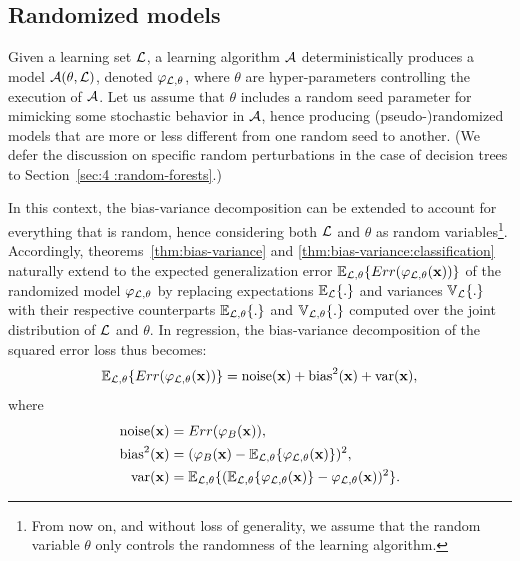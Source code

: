 \subsection{Randomized models}

Given a learning set ${\cal L}$, a learning algorithm ${\cal A}$
deterministically produces a model ${\cal A}(\theta, {\cal L})$, denoted
$\varphi_{{\cal L},\theta}$\label{ntn:varphi-Ltheta}, where $\theta$ are
hyper-parameters controlling the execution of ${\cal A}$. Let us assume that $\theta$
includes a random seed parameter for mimicking some stochastic behavior in
${\cal A}$, hence producing (pseudo-)randomized models that are more or less
different from one random seed to another. (We defer the discussion on specific
random perturbations in the case of decision trees to Section~\ref{sec:4
:random-forests}.)

In this context, the bias-variance decomposition can be extended to account for
everything that is random, hence considering both ${\cal L}$ and $\theta$ as
random variables\footnote{From now on, and without loss of generality, we
assume that the random variable $\theta$ only controls the randomness of the
learning algorithm.}.
Accordingly, theorems~\ref{thm:bias-variance} and \ref{thm:bias-variance:classification}
naturally extend to the expected generalization error
$\mathbb{E}_{{\cal L},\theta} \{ Err(\varphi_{{\cal L},\theta}(\mathbf{x})) \}$
of the randomized model $\varphi_{{\cal L},\theta}$ by replacing expectations
$\mathbb{E}_{\cal L} \{ . \}$ and variances $\mathbb{V}_{\cal L} \{ . \}$ with
their respective counterparts $\mathbb{E}_{{\cal L},\theta} \{ . \}$ and
$\mathbb{V}_{{\cal L},\theta} \{ . \}$ computed over the joint distribution of
${\cal L}$ and $\theta$. In regression, the bias-variance decomposition
of the squared error loss thus becomes:
\begin{equation}
\mathbb{E}_{{\cal L},\theta} \{ Err(\varphi_{{\cal L},\theta}(\mathbf{x})) \} = \text{noise}(\mathbf{x}) + \text{bias}^2(\mathbf{x}) + \text{var}(\mathbf{x}),
\end{equation}
where
\begin{align}
\text{noise}(\mathbf{x}) &= Err(\varphi_B(\mathbf{x})), \\
\text{bias}^2(\mathbf{x}) &= (\varphi_B(\mathbf{x}) - \mathbb{E}_{{\cal L},\theta} \{ \varphi_{{\cal L},\theta}(\mathbf{x}) \} )^2, \\
\text{var}(\mathbf{x}) &= \mathbb{E}_{{\cal L},\theta} \{ (\mathbb{E}_{{\cal L},\theta} \{ \varphi_{{\cal L},\theta}(\mathbf{x}) \} - \varphi_{{\cal L},\theta}(\mathbf{x}))^2 \}.
\end{align}

